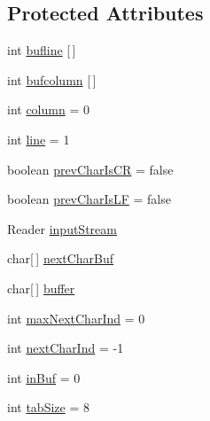 \subsection*{Protected Attributes}
\begin{DoxyCompactItemize}
\item 
int \hyperlink{classuk_1_1ac_1_1manchester_1_1cs_1_1_b_o_m_safe_java_char_stream_a828aaf344268763988f351feab8f29cf}{bufline} \mbox{[}$\,$\mbox{]}
\item 
int \hyperlink{classuk_1_1ac_1_1manchester_1_1cs_1_1_b_o_m_safe_java_char_stream_a302436adaba08be8b5b4e7a7356cb5de}{bufcolumn} \mbox{[}$\,$\mbox{]}
\item 
int \hyperlink{classuk_1_1ac_1_1manchester_1_1cs_1_1_b_o_m_safe_java_char_stream_af583cf2bb7d2aa6faf7d6e42409b9137}{column} = 0
\item 
int \hyperlink{classuk_1_1ac_1_1manchester_1_1cs_1_1_b_o_m_safe_java_char_stream_ac3c28fba93517ce43b78e339fbb3af60}{line} = 1
\item 
boolean \hyperlink{classuk_1_1ac_1_1manchester_1_1cs_1_1_b_o_m_safe_java_char_stream_a3b96b080ad2677016f4d31b7afbb4cd9}{prev\-Char\-Is\-C\-R} = false
\item 
boolean \hyperlink{classuk_1_1ac_1_1manchester_1_1cs_1_1_b_o_m_safe_java_char_stream_a124691351253415c0ce35f398dda2622}{prev\-Char\-Is\-L\-F} = false
\item 
Reader \hyperlink{classuk_1_1ac_1_1manchester_1_1cs_1_1_b_o_m_safe_java_char_stream_af845c159f4d475d36d76ef4db915f1b2}{input\-Stream}
\item 
char\mbox{[}$\,$\mbox{]} \hyperlink{classuk_1_1ac_1_1manchester_1_1cs_1_1_b_o_m_safe_java_char_stream_a99693c7cdc457ffa9d72cfc64397a980}{next\-Char\-Buf}
\item 
char\mbox{[}$\,$\mbox{]} \hyperlink{classuk_1_1ac_1_1manchester_1_1cs_1_1_b_o_m_safe_java_char_stream_ae74b4f06453cdd443c1ba5592fd20db4}{buffer}
\item 
int \hyperlink{classuk_1_1ac_1_1manchester_1_1cs_1_1_b_o_m_safe_java_char_stream_a8e3d04e2205058393aee2eecc26a8b6a}{max\-Next\-Char\-Ind} = 0
\item 
int \hyperlink{classuk_1_1ac_1_1manchester_1_1cs_1_1_b_o_m_safe_java_char_stream_ae7a05560f7b51e42b390c8302c264a20}{next\-Char\-Ind} = -\/1
\item 
int \hyperlink{classuk_1_1ac_1_1manchester_1_1cs_1_1_b_o_m_safe_java_char_stream_a4b83839d9cbe068d7995047bbb634f87}{in\-Buf} = 0
\item 
int \hyperlink{classuk_1_1ac_1_1manchester_1_1cs_1_1_b_o_m_safe_java_char_stream_a15e060ac26a6067ec0a12b038842d861}{tab\-Size} = 8
\end{DoxyCompactItemize}
